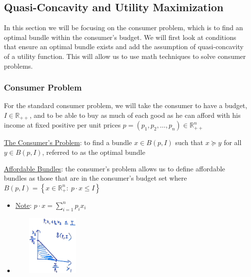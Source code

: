 \documentclass{article}
\begin{document}
\newpage

\vspace{2.5mm}
\subsection{Quasi-Concavity and Utility Maximization}
In this section we will be focusing on the consumer problem, which is to find an optimal bundle within the consumer's budget. We will first look at conditions that ensure an optimal bundle exists and add the assumption of quasi-concavity of a utility function. This will allow us to use math techniques to solve consumer problems. \par
\vspace{6mm}
\subsubsection{Consumer Problem}
For the standard consumer problem, we will take the consumer to have a budget, $I \in \mathbb{R}_{++}$, and to be able to buy as much of each good as he can afford with his income at fixed positive per unit prices $p = (p_{1}, p_{2}, \dots, p_{n}) \in \mathbb{R}_{++}^{n}$ \par \vspace{0.3em}
\underline{The Consumer's Problem}: to find a bundle $x \in B(p, I)$ such that $x \succeq y$ for all $y \in B(p, I)$, referred to as the optimal bundle \par
\underline{Affordable Bundles}: the consumer's problem allows us to define affordable bundles as those that are in the consumer's budget set where $B(p, I) = \left\{ x \in \mathbb{R}_{+}^{n}: \ p \cdot x \leq I \right\}$
\begin{itemize}
  \item  \underline{Note}: $p \cdot x = \sum_{i=1}^{n}p_{i}x_{i}$
  \item  \includegraphics[width=4cm, height=3cm]{pic13}
\end{itemize}
\par
\vspace{6mm}
\end{document}
